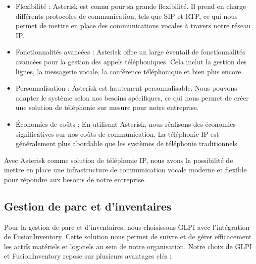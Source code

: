 \begin{itemize}

\item Flexibilité : Asterisk est connu pour sa grande flexibilité. Il prend en charge différents protocoles de communication, tels que SIP et RTP, ce qui nous permet de mettre en place des communications vocales à travers notre réseau IP.\\

\item Fonctionnalités avancées : Asterisk offre un large éventail de fonctionnalités avancées pour la gestion des appels téléphoniques. Cela inclut la gestion des lignes, la messagerie vocale, la conférence téléphonique et bien plus encore.\\

\item Personnalisation : Asterisk est hautement personnalisable. Nous pouvons adapter le système selon nos besoins spécifiques, ce qui nous permet de créer une solution de téléphonie sur mesure pour notre entreprise.\\

\item Économies de coûts : En utilisant Asterisk, nous réalisons des économies significatives sur nos coûts de communication. La téléphonie IP est généralement plus abordable que les systèmes de téléphonie traditionnels.\\

\end{itemize}

Avec Asterisk comme solution de téléphonie IP, nous avons la possibilité de mettre en place une infrastructure de communication vocale moderne et flexible pour répondre aux besoins de notre entreprise.\\





\subsection{Gestion de parc et d'inventaires}

Pour la gestion de parc et d'inventaires, nous choisissons GLPI avec l'intégration de FusionInventory. Cette solution nous permet de suivre et de gérer efficacement les actifs matériels et logiciels au sein de notre organisation. Notre choix de GLPI et FusionInventory repose sur plusieurs avantages clés :

